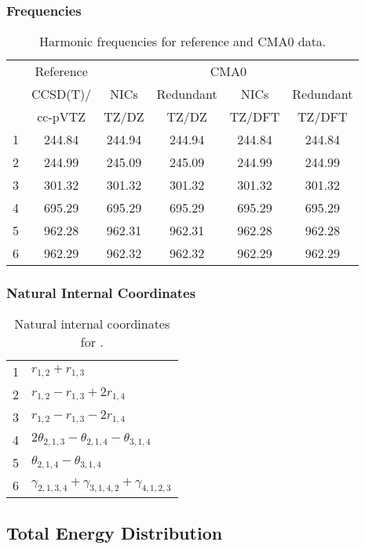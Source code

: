\documentclass[10pt,oneside]{article}
\begin{document}
\begin{table}[h!]
\subsubsection*{Frequencies}
\centering
\caption{Harmonic frequencies for reference and CMA0 data.}
\begin{tabular}{cccccc}
\toprule
{} & Reference & \multicolumn{4}{c}{CMA0} \\
{} &  CCSD(T)/ &   NICs &  Redundant &   NICs & Redundant \\
{} &   cc-pVTZ &  TZ/DZ &      TZ/DZ & TZ/DFT &    TZ/DFT \\
\midrule
1 &    244.84 & 244.94 &     244.94 & 244.84 &    244.84 \\
2 &    244.99 & 245.09 &     245.09 & 244.99 &    244.99 \\
3 &    301.32 & 301.32 &     301.32 & 301.32 &    301.32 \\
4 &    695.29 & 695.29 &     695.29 & 695.29 &    695.29 \\
5 &    962.28 & 962.31 &     962.31 & 962.28 &    962.28 \\
6 &    962.29 & 962.32 &     962.32 & 962.29 &    962.29 \\
\bottomrule
\end{tabular}
\end{table}

\begin{table}[h!]
\subsubsection*{Natural Internal Coordinates}
\centering
\caption{Natural internal coordinates for .}
\small
\begin{tabular}{ll}
\toprule
  1   & $r_{1,2} + r_{1,3}$ \\
  2   & $r_{1,2} - r_{1,3} + 2r_{1,4}$ \\
  3   & $r_{1,2} - r_{1,3} - 2r_{1,4}$ \\
  4   & $2\theta_{2,1,3} - \theta_{2,1,4} - \theta_{3,1,4}$ \\
  5   & $\theta_{2,1,4} - \theta_{3,1,4}$ \\
  6   & $\gamma_{2,1,3,4} + \gamma_{3,1,4,2} + \gamma_{4,1,2,3}$ \\
\bottomrule
\end{tabular}
\end{table}

\begin{table}
\subsection*{Total Energy Distribution}
\centering\end{table}
\end{document}
